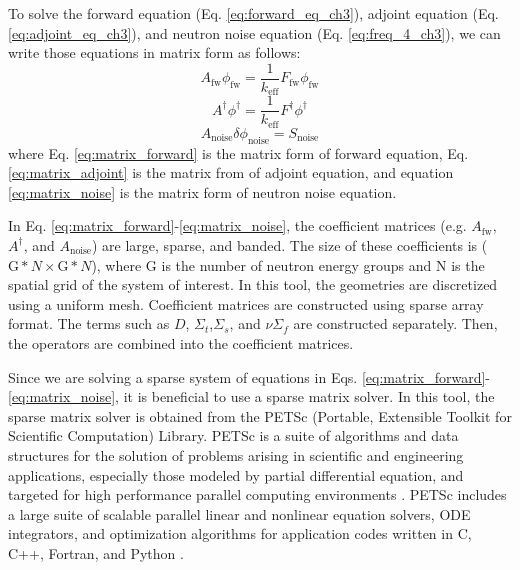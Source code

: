 To solve the forward equation (Eq. \ref{eq:forward_eq_ch3}), adjoint equation (Eq. \ref{eq:adjoint_eq_ch3}), and neutron noise equation (Eq. \ref{eq:freq_4_ch3}), we can write those equations in matrix form as follows:
\begin{equation}\label{eq:matrix_forward}
    A_{\text{fw}} \phi_{\text{fw}} = \frac{1}{k_{\text{eff}}} F_{\text{fw}} \phi_{\text{fw}}
\end{equation}
\begin{equation}\label{eq:matrix_adjoint}
    A^{\dagger} \phi^{\dagger} = \frac{1}{k_{\text{eff}}} F^{\dagger} \phi^{\dagger}
\end{equation}
\begin{equation}\label{eq:matrix_noise}
    A_{\text{noise}} \delta \phi_{\text{noise}} = S_{\text{noise}}
\end{equation}
where Eq. \ref{eq:matrix_forward} is the matrix form of forward equation, Eq. \ref{eq:matrix_adjoint} is the matrix from of adjoint equation, and equation \ref{eq:matrix_noise} is the matrix form of neutron noise equation.

In Eq. \ref{eq:matrix_forward}-\ref{eq:matrix_noise}, the coefficient matrices (e.g. $A_{\text{fw}}$, $A^{\dagger}$, and $A_{\text{noise}}$) are large, sparse, and banded. The size of these coefficients is ($\text{G} * N \times \text{G} * N$), where G is the number of neutron energy groups and N is the spatial grid of the system of interest. In this tool, the geometries are discretized using a uniform mesh. Coefficient matrices are constructed using sparse array format. The terms such as $D$, $\Sigma_t$,$\Sigma_s$, and $\nu \Sigma_f$ are constructed separately. Then, the operators are combined into the coefficient matrices. 

Since we are solving a sparse system of equations in Eqs. \ref{eq:matrix_forward}-\ref{eq:matrix_noise}, it is beneficial to use a sparse matrix solver. In this tool, the sparse matrix solver is obtained from the PETSc (Portable, Extensible Toolkit for Scientific Computation) Library. PETSc is a suite of algorithms and data structures for the solution of problems arising in scientific and engineering applications, especially those modeled by partial differential equation, and targeted for high performance parallel computing environments \cite{dalcinParallelDistributedComputing2011}. PETSc includes a large suite of scalable parallel linear and nonlinear equation solvers, ODE integrators, and optimization algorithms for application codes written in C, C++, Fortran, and Python \cite{balayPETScTAOUsers2025}.

